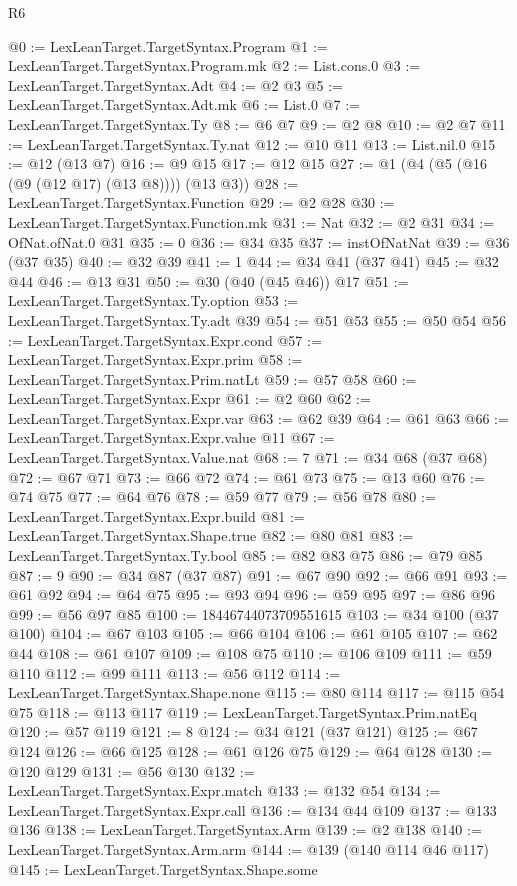 \begin{lexlean}{R6}
\begin{coremodule}
@0 := LexLeanTarget.TargetSyntax.Program
@1 := LexLeanTarget.TargetSyntax.Program.mk
@2 := List.cons.{0}
@3 := LexLeanTarget.TargetSyntax.Adt
@4 := @2 @3
@5 := LexLeanTarget.TargetSyntax.Adt.mk
@6 := List.{0}
@7 := LexLeanTarget.TargetSyntax.Ty
@8 := @6 @7
@9 := @2 @8
@10 := @2 @7
@11 := LexLeanTarget.TargetSyntax.Ty.nat
@12 := @10 @11
@13 := List.nil.{0}
@15 := @12 (@13 @7)
@16 := @9 @15
@17 := @12 @15
@27 := @1 (@4 (@5 (@16 (@9 (@12 @17) (@13 @8)))) (@13 @3))
@28 := LexLeanTarget.TargetSyntax.Function
@29 := @2 @28
@30 := LexLeanTarget.TargetSyntax.Function.mk
@31 := Nat
@32 := @2 @31
@34 := OfNat.ofNat.{0} @31
@35 := 0
@36 := @34 @35
@37 := instOfNatNat
@39 := @36 (@37 @35)
@40 := @32 @39
@41 := 1
@44 := @34 @41 (@37 @41)
@45 := @32 @44
@46 := @13 @31
@50 := @30 (@40 (@45 @46)) @17
@51 := LexLeanTarget.TargetSyntax.Ty.option
@53 := LexLeanTarget.TargetSyntax.Ty.adt @39
@54 := @51 @53
@55 := @50 @54
@56 := LexLeanTarget.TargetSyntax.Expr.cond
@57 := LexLeanTarget.TargetSyntax.Expr.prim
@58 := LexLeanTarget.TargetSyntax.Prim.natLt
@59 := @57 @58
@60 := LexLeanTarget.TargetSyntax.Expr
@61 := @2 @60
@62 := LexLeanTarget.TargetSyntax.Expr.var
@63 := @62 @39
@64 := @61 @63
@66 := LexLeanTarget.TargetSyntax.Expr.value @11
@67 := LexLeanTarget.TargetSyntax.Value.nat
@68 := 7
@71 := @34 @68 (@37 @68)
@72 := @67 @71
@73 := @66 @72
@74 := @61 @73
@75 := @13 @60
@76 := @74 @75
@77 := @64 @76
@78 := @59 @77
@79 := @56 @78
@80 := LexLeanTarget.TargetSyntax.Expr.build
@81 := LexLeanTarget.TargetSyntax.Shape.true
@82 := @80 @81
@83 := LexLeanTarget.TargetSyntax.Ty.bool
@85 := @82 @83 @75
@86 := @79 @85
@87 := 9
@90 := @34 @87 (@37 @87)
@91 := @67 @90
@92 := @66 @91
@93 := @61 @92
@94 := @64 @75
@95 := @93 @94
@96 := @59 @95
@97 := @86 @96
@99 := @56 @97 @85
@100 := 18446744073709551615
@103 := @34 @100 (@37 @100)
@104 := @67 @103
@105 := @66 @104
@106 := @61 @105
@107 := @62 @44
@108 := @61 @107
@109 := @108 @75
@110 := @106 @109
@111 := @59 @110
@112 := @99 @111
@113 := @56 @112
@114 := LexLeanTarget.TargetSyntax.Shape.none
@115 := @80 @114
@117 := @115 @54 @75
@118 := @113 @117
@119 := LexLeanTarget.TargetSyntax.Prim.natEq
@120 := @57 @119
@121 := 8
@124 := @34 @121 (@37 @121)
@125 := @67 @124
@126 := @66 @125
@128 := @61 @126 @75
@129 := @64 @128
@130 := @120 @129
@131 := @56 @130
@132 := LexLeanTarget.TargetSyntax.Expr.match
@133 := @132 @54
@134 := LexLeanTarget.TargetSyntax.Expr.call
@136 := @134 @44 @109
@137 := @133 @136
@138 := LexLeanTarget.TargetSyntax.Arm
@139 := @2 @138
@140 := LexLeanTarget.TargetSyntax.Arm.arm
@144 := @139 (@140 @114 @46 @117)
@145 := LexLeanTarget.TargetSyntax.Shape.some

\end{coremodule}
\end{lexlean}
